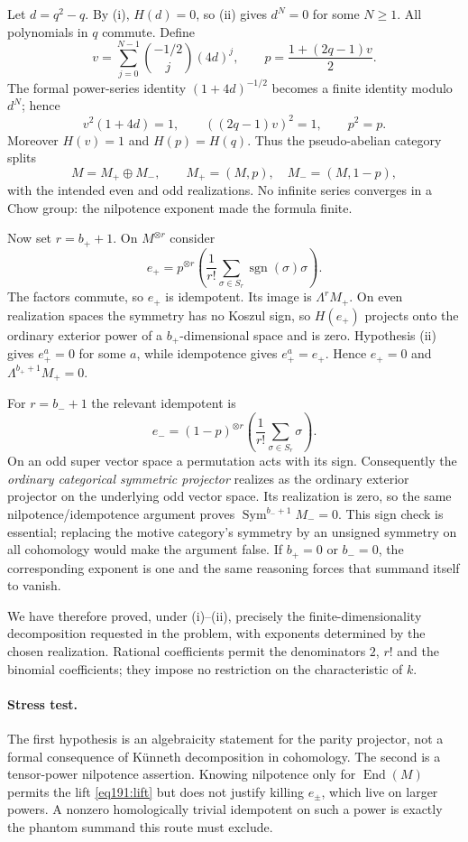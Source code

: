 \documentclass[11pt,a4paper]{article}
\numberwithin{equation}{section}
\begin{document}
Let $d=q^2-q$. By (i), $H(d)=0$, so (ii) gives $d^N=0$ for some $N\ge1$. All polynomials in $q$ commute. Define
\begin{equation}\label{eq191:lift}
 v=\sum_{j=0}^{N-1}\binom{-1/2}{j}(4d)^j,
 \qquad p=\frac{1+(2q-1)v}{2}.
\end{equation}
The formal power-series identity $(1+4d)^{-1/2}$ becomes a finite identity modulo $d^N$; hence
\[
 v^2(1+4d)=1,\qquad ((2q-1)v)^2=1,
 \qquad p^2=p.
\]
Moreover $H(v)=1$ and $H(p)=H(q)$. Thus the pseudo-abelian category splits
\[
 M=M_+\oplus M_-,\qquad M_+=(M,p),\quad M_-=(M,1-p),
\]
with the intended even and odd realizations. No infinite series converges in a Chow group: the nilpotence exponent made the formula finite.

Now set $r=b_++1$. On $M^{\otimes r}$ consider
\[
 e_+=p^{\otimes r}\left(\frac1{r!}\sum_{\sigma\in S_r}
             \operatorname{sgn}(\sigma)\sigma\right).
\]
The factors commute, so $e_+$ is idempotent. Its image is $\Lambda^rM_+$. On even realization spaces the symmetry has no Koszul sign, so $H(e_+)$ projects onto the ordinary exterior power of a $b_+$-dimensional space and is zero. Hypothesis (ii) gives $e_+^a=0$ for some $a$, while idempotence gives $e_+^a=e_+$. Hence $e_+=0$ and $\Lambda^{b_++1}M_+=0$.

For $r=b_-+1$ the relevant idempotent is
\[
 e_-=(1-p)^{\otimes r}\left(\frac1{r!}\sum_{\sigma\in S_r}\sigma\right).
\]
On an odd super vector space a permutation acts with its sign. Consequently the \emph{ordinary categorical symmetric projector} realizes as the ordinary exterior projector on the underlying odd vector space. Its realization is zero, so the same nilpotence/idempotence argument proves $\operatorname{Sym}^{b_-+1}M_-=0$. This sign check is essential; replacing the motive category's symmetry by an unsigned symmetry on all cohomology would make the argument false. If $b_+=0$ or $b_-=0$, the corresponding exponent is one and the same reasoning forces that summand itself to vanish.

We have therefore proved, under (i)--(ii), precisely the finite-dimensionality decomposition requested in the problem, with exponents determined by the chosen realization. Rational coefficients permit the denominators $2$, $r!$ and the binomial coefficients; they impose no restriction on the characteristic of $k$.

\paragraph{Stress test.}
The first hypothesis is an algebraicity statement for the parity projector, not a formal consequence of K\"unneth decomposition in cohomology. The second is a tensor-power nilpotence assertion. Knowing nilpotence only for $\operatorname{End}(M)$ permits the lift \eqref{eq191:lift} but does not justify killing $e_\pm$, which live on larger powers. A nonzero homologically trivial idempotent on such a power is exactly the phantom summand this route must exclude.
\end{document}
